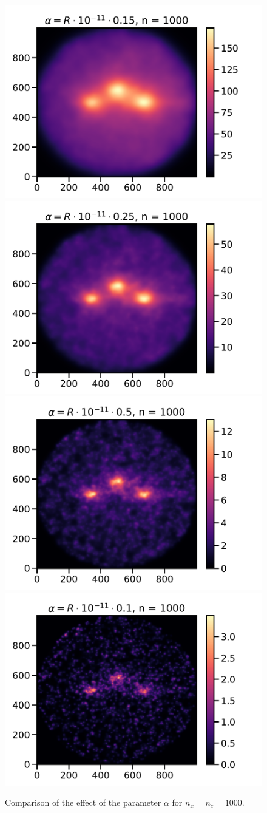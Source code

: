 \documentclass[a4paper,12pt]{article}
\begin{document}
\begin{figure}[H]
    \includegraphics[width=.6\textwidth]{../img-mpi/graph1000-0.pdf}\hfill
    \includegraphics[width=.6\textwidth]{../img-mpi/graph1000-1.pdf}\hfill
    \\[\smallskipamount]
    \includegraphics[width=.6\textwidth]{../img-mpi/graph1000-2.pdf}\hfill
    \includegraphics[width=.6\textwidth]{../img-mpi/graph1000-3.pdf}
    \caption{Comparison of the effect of the parameter \(\alpha\)
    for \(n_x = n_z = 1000\).}
\end{figure}
\end{document}
